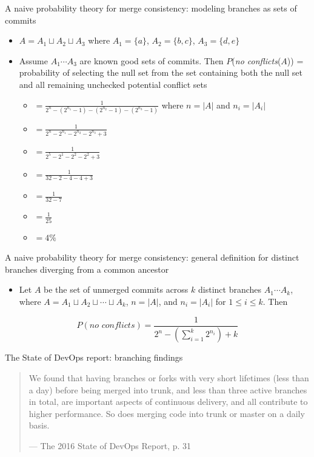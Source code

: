 \documentclass{beamer}
\begin{document}
	\begin{frame}{A naive probability theory for merge consistency: modeling branches as sets of commits}
		\begin{itemize}
			\item $A = A_1 \sqcup A_2 \sqcup A_3$ where $A_1 = \{a\}$, $A_2 = \{b, c\}$, $A_3 = \{d, e\}$ \pause
			\item Assume $A_1 \cdots A_3$ are known good sets of commits. Then $P$(\textit{no conflicts}($A$)) = probability of selecting the null set from the set containing both the null set and all remaining unchecked potential conflict sets  \pause
			\begin{itemize}
				\item $= \frac{1}{2^n - (2^{n_1} - 1) - (2^{n_2} - 1) - (2^{n_3} - 1)}$ where $n = |A|$ and $n_i = |A_i|$ \pause
				\item $= \frac{1}{2^n - 2^{n_1} - 2^{n_2} - 2^{n_3} + 3}$ \pause
				\item $= \frac{1}{2^5 - 2^1 - 2^2 - 2^2 + 3}$ \pause 
				\item $ = \frac{1}{32 - 2 - 4 - 4 + 3}$ \pause 
				\item $= \frac{1}{32 - 7}$ \pause
				\item $= \frac{1}{25}$ \pause
				\item $= 4\%$ \pause		
			\end{itemize}
		\end{itemize}
	\end{frame}
	\begin{frame}{A naive probability theory for merge consistency: general definition for distinct branches diverging from a common ancestor}
		\begin{itemize}
			\item Let $A$ be the set of unmerged commits across $k$ distinct branches $A_1 \cdots A_k$, where $A = A_1 \sqcup A_2 \sqcup \cdots \sqcup A_k$, $n = |A|$, and $n_i = |A_i|$ for $1 \leq i \leq k$. Then \pause
		\end{itemize}
		\[
		P(\textit{no conflicts}) = \frac{1}{2^n - (\sum_{i=1}^k2^{n_i}) + k}
		\]
	\end{frame}
	\begin{frame}{The State of DevOps report: branching findings}
		\begin{quote}
			We found that having branches or forks with very short
			lifetimes (less than a day) before being merged into trunk,
			and less than three active branches in total, are important
			aspects of continuous delivery, and all contribute to
			higher performance. So does merging code into trunk
			or master on a daily basis. 
			
			--- The 2016 State of DevOps Report, p. 31
		\end{quote}
	\end{frame}
	
\end{document}
